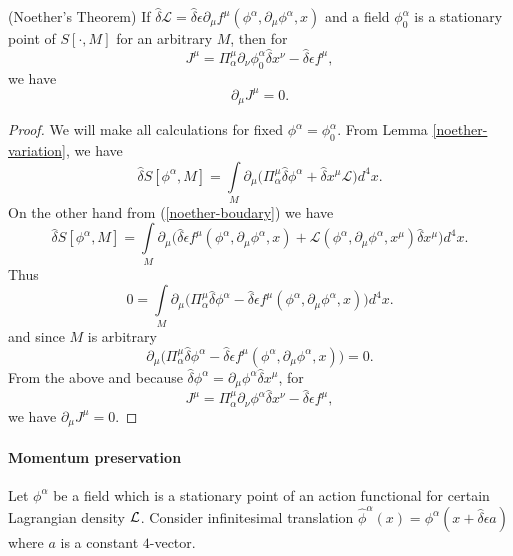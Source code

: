 \documentclass[main.tex]{subfiles}
\begin{document}
\begin{theorem}(Noether's Theorem)
If $\hat{\delta} \mathcal{L} = \hat{\delta} \epsilon \partial_\mu f^\mu(\phi^\alpha, \partial_\mu \phi^\alpha, x)$ and a field $\phi_0^\alpha$ is a stationary point of $S[\cdot, M]$ for an arbitrary $M$, then for
\begin{equation}
J^\mu = \Pi_\alpha^\mu \partial_\nu \phi_0^\alpha \hat{\delta} x^\nu - \hat{\delta} \epsilon f^\mu,
\end{equation}
we have 
\begin{equation}
\partial_\mu J^\mu = 0.
\end{equation}
\end{theorem}
\begin{proof}
We will make all calculations for fixed $\phi^\alpha = \phi_0^\alpha$.
From Lemma \ref{noether-variation}, we have
\begin{equation}
\hat{\delta}S[\phi^\alpha, M] = \int\limits_M \partial_\mu \bigg( \Pi_\alpha^\mu \hat{\delta} \phi^\alpha + \hat{\delta}x^\mu \mathcal{L} \bigg)d^4 x.
\end{equation}
On the other hand from (\ref{noether-boudary}) we have
\begin{equation}
\hat{\delta}S[\phi^\alpha, M] = \int\limits_{M} \partial_\mu\bigg(\hat{\delta}\epsilon f^\mu(\phi^\alpha, \partial_\mu \phi^\alpha, x) + 
\mathcal{L}(\phi^\alpha, \partial_\mu \phi^\alpha, x^\mu)\hat{\delta}x^\mu\bigg)d^4 x.
\end{equation}
Thus
\begin{equation}
0 = \int\limits_{M} \partial_\mu \bigg( \Pi_\alpha^\mu \hat{\delta} \phi^\alpha - \hat{\delta}\epsilon f^\mu(\phi^\alpha, \partial_\mu \phi^\alpha, x)
\bigg)d^4 x.
\end{equation}
and since $M$ is arbitrary
\begin{equation}
\partial_\mu \bigg( \Pi_\alpha^\mu \hat{\delta} \phi^\alpha - \hat{\delta}\epsilon f^\mu(\phi^\alpha, \partial_\mu \phi^\alpha, x)
\bigg) = 0.
\end{equation}
From the above and because $\hat{\delta} \phi^\alpha = \partial_\mu \phi^\alpha \hat{\delta} x^\mu$, for
\begin{equation}
J^\mu = \Pi_\alpha^\mu \partial_\nu \phi^\alpha \hat{\delta} x^\nu - \hat{\delta} \epsilon f^\mu,
\end{equation}
we have $\partial_\mu J^\mu = 0$.
\end{proof}

\paragraph{Momentum preservation}
Let $\phi^\alpha$ be a field which is a stationary point of an action functional for certain Lagrangian density $\mathcal{L}$. Consider infinitesimal translation $\hat{\phi}^\alpha(x) = \phi^\alpha(x + \hat{\delta}\epsilon a)$ where $a$ is a constant $4$-vector.
\end{document}
